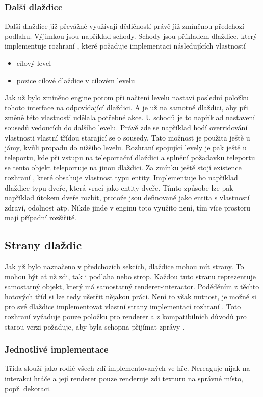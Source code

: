 \subsubsection{Další dlaždice}
Další dlaždice již převážně využívají dědičností právě již zmíněnou předchozí podlahu. Výjimkou jsou například schody.
Schody jsou příkladem  dlaždice, který implementuje rozhraní  ,  které požaduje implementaci 
následujících vlastností
\begin{itemize}
\item cílový level
\item pozice cílové dlaždice v cílovém levelu
\end{itemize}

Jak už bylo zmíněno engine potom při načtení levelu nastaví poslední položku tohoto interface 
 na odpovídající dlaždici. A je už na samotné dlaždici, aby při změně této vlastnosti udělala 
potřebné akce. U schodů je to například nastavení sousedů vedoucích do dalšího levelu. Právě zde se například hodí 
overridování vlastnosti  vlastní třídou starající se o sousedy. Tato možnost je použita ještě u jámy,
kvůli propadu do nižšího levelu. Rozhraní spojující levely je pak ještě u teleportu, kde při vstupu na teleportační
dlaždici a splnění požadavku teleportu se tento objekt teleportuje na jinou dlaždici. Za zmínku ještě stojí existence
rozhraní , které obsahuje vlastnost typu entity. Implementuje ho například dlaždice typu dveře,
která vrací jako entity dveře. Tímto způsobe lze pak například útokem dveře rozbít, protože jsou definované jako 
entita s vlastností zdraví, odolnost atp. Nikde jinde v enginu toto využito není, tím více prostoru mají případní
rozšiřité.

\subsection{Strany dlaždic}
Jak již bylo naznačeno v předchozích sekcích, dlaždice mohou mít strany. To mohou být ať už zdi, tak i podlaha nebo strop.
Každou tuto stranu reprezentuje samostatný objekt, který má samostatný renderer-interactor. Poděděním z těchto hotových tříd
si lze tedy ušetřit nějakou práci. Není to však nutnost, je možné si pro své dlaždice implementovat vlastní
strany implementací rozhraní . Toto rozhraní vyžaduje pouze položku pro renderer a z kompatibilních důvodů
pro starou verzi požaduje, aby byla schopna přijímat zprávy .

\subsubsection{Jednotlivé implementace}
Třída  slouží jako rodič všech zdí implementovaných ve hře. Nereaguje nijak na interakci
hráče a její renderer pouze renderuje zdi  texturu na správné místo, popř. dekoraci.

